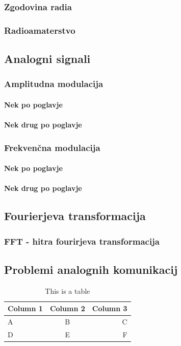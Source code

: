 \documentclass[12pt]{report}
\begin{document}
\subsubsection{Zgodovina radia}
\subsubsection{Radioamaterstvo}
\subsection{Analogni signali}
\subsubsection{Amplitudna modulacija}
\paragraph{Nek po poglavje}
\paragraph{Nek drug po poglavje}
\subsubsection{Frekvenčna modulacija}
\paragraph{Nek po poglavje}
\paragraph{Nek drug po poglavje}

\newpage
\subsection{Fourierjeva transformacija}
\subsubsection{FFT - hitra fourirjeva transformacija}
\subsection{Problemi analognih komunikacij}
\begin{table}[h]
    \centering
    \caption{This is a table}
    \begin{tabular}{lcr}
      \hline
      Column 1 & Column 2 & Column 3 \\
      \hline
      A & B & C \\
      D & E & F \\
      \hline
    \end{tabular}
    \label{tab:table}
\end{table}  
\end{document}
